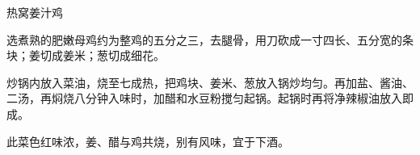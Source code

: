 \begin{recipe}{热窝姜汁鸡}

\ingredients


\cooking

\step 选煮熟的肥嫩母鸡约为整鸡的五分之三，去腿骨，用刀砍成一寸四长、五分宽的条
块；姜切成姜米；葱切成细花。

\step 炒锅内放入菜油，烧至七成热，把鸡块、姜米、葱放入锅炒均匀。再加盐、酱油、
二汤，再焖烧八分钟入味时，加醋和水豆粉搅匀起锅。起锅时再将净辣椒油放入即成。

\notes

此菜色红味浓，姜、醋与鸡共烧，别有风味，宜于下酒。

\end{recipe}

